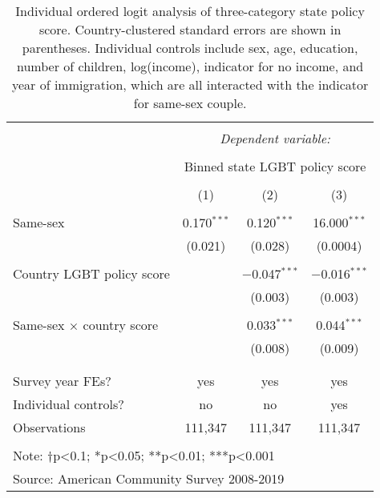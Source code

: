 \documentclass[
  11pt,
]{article}
\begin{document}
\begin{table}[!htbp] \centering 
  \caption{Individual ordered logit analysis of three-category state policy score. Country-clustered standard errors are shown in parentheses. Individual controls include sex, age, education, number of children, log(income), indicator for no income, and year of immigration, which are all interacted with the indicator for same-sex couple.} 
  \label{tab:ord} 
\begin{tabular}{@{\extracolsep{5pt}}lccc} 
\\[-1.8ex]\hline 
\hline \\[-1.8ex] 
 & \multicolumn{3}{c}{\textit{Dependent variable:}} \\ 
\cline{2-4} 
\\[-1.8ex] & \multicolumn{3}{c}{Binned state LGBT policy score} \\ 
\\[-1.8ex] & (1) & (2) & (3)\\ 
\hline \\[-1.8ex] 
 Same-sex & 0.170$^{***}$ & 0.120$^{***}$ & 16.000$^{***}$ \\ 
  & (0.021) & (0.028) & (0.0004) \\ 
  & & & \\ 
 Country LGBT policy score &  & $-$0.047$^{***}$ & $-$0.016$^{***}$ \\ 
  &  & (0.003) & (0.003) \\ 
  & & & \\ 
 Same-sex × country score &  & 0.033$^{***}$ & 0.044$^{***}$ \\ 
  &  & (0.008) & (0.009) \\ 
  & & & \\ 
\hline \\[-1.8ex] 
Survey year FEs? & yes & yes & yes \\ 
Individual controls? & no & no & yes \\ 
Observations & 111,347 & 111,347 & 111,347 \\ 
\hline 
\hline \\[-1.8ex] 
\multicolumn{4}{l}{Note: †p<0.1; *p<0.05; **p<0.01; ***p<0.001} \\ 
\multicolumn{4}{l}{Source: American Community Survey 2008-2019} \\ 
\end{tabular} 
\end{table}
\end{document}
